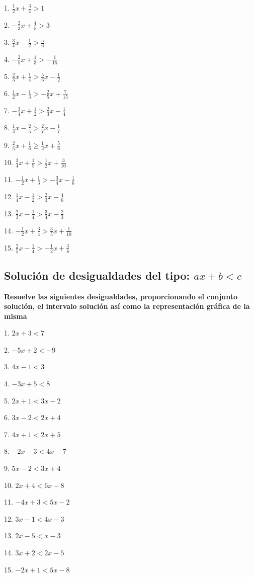\documentclass[]{book}
\begin{document}
\begin{multicols}{3}
1. $\frac{1}{2}x+\frac{3}{4}>1$

2. $-\frac{2}{3}x+\frac{4}{5}>3$

3. $\frac{3}{4}x-\frac{1}{2}>\frac{5}{6}$

4. $-\frac{2}{5}x+\frac{1}{3}>-\frac{1}{15}$

5. $\frac{2}{3}x+\frac{1}{4}>\frac{5}{6}x-\frac{1}{2}$

6. $\frac{1}{2}x-\frac{1}{3}>-\frac{2}{5}x+\frac{7}{15}$

7. $-\frac{3}{4}x+\frac{1}{2}>\frac{2}{3}x-\frac{1}{4}$

8. $\frac{1}{3}x-\frac{2}{5}>\frac{2}{7}x-\frac{1}{7}$

9. $\frac{2}{5}x+\frac{1}{6}\geq\frac{1}{3}x+\frac{5}{6}$

10. $\frac{3}{4}x+\frac{1}{5}>\frac{1}{2}x+\frac{3}{10}$

11. $-\frac{1}{2}x+\frac{1}{3}>-\frac{3}{4}x-\frac{1}{6}$

12. $\frac{1}{4}x-\frac{1}{2}>\frac{2}{3}x-\frac{4}{6}$

13. $\frac{2}{3}x-\frac{1}{4}>\frac{3}{4}x-\frac{2}{3}$

14. $-\frac{1}{2}x+\frac{3}{4}>\frac{3}{5}x+\frac{1}{10}$

15. $\frac{2}{5}x-\frac{1}{4}>-\frac{1}{2}x+\frac{3}{8}$
\end{multicols}

\subsection{\texorpdfstring{Solución de desigualdades del tipo:
\(ax+b<c\)}{Solución de desigualdades del tipo: ax+b\textless{}c}}\label{soluciuxf3n-de-desigualdades-del-tipo-axbc-1}

\textbf{Resuelve las siguientes desigualdades, proporcionando el
conjunto solución, el intervalo solución así como la representación
gráfica de la misma}

\begin{multicols}{3}
1. $2x+3<7$

2. $-5x+2<-9$

3. $4x-1<3$

4. $-3x+5<8$

5. $2x+1<3x-2$

6. $3x-2<2x+4$

7. $4x+1<2x+5$

8. $-2x-3<4x-7$

9. $5x-2<3x+4$

10. $2x+4<6x-8$

11. $-4x+3<5x-2$

12. $3x-1<4x-3$

13. $2x-5<x-3$

14. $3x+2<2x-5$

15. $-2x+1<5x-8$
\end{multicols}
\end{document}
